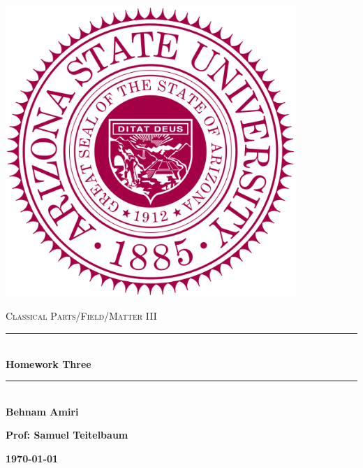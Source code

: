 \documentclass[fleqn]{article}
\begin{document}
  \begin{titlepage}

    \newcommand{\HRule}{\rule{\linewidth}{0.5mm}}

    \center

    \begin{center}
      \includegraphics[height=11cm, width=11cm]{asu.png}
    \end{center}

    \vline

    \textsc{\LARGE Classical Parts/Field/Matter III}\\[1.5cm]

    \HRule \\[0.5cm]
    { \huge \bfseries Homework Three}\\[0.4cm] 
    \HRule \\[1.0cm]

    \textbf{Behnam Amiri}

    \bigbreak

    \textbf{Prof: Samuel Teitelbaum}

    \bigbreak

    \textbf{{\large \today}\\[2cm]}

    \vfill

  \end{titlepage}
\end{document}
